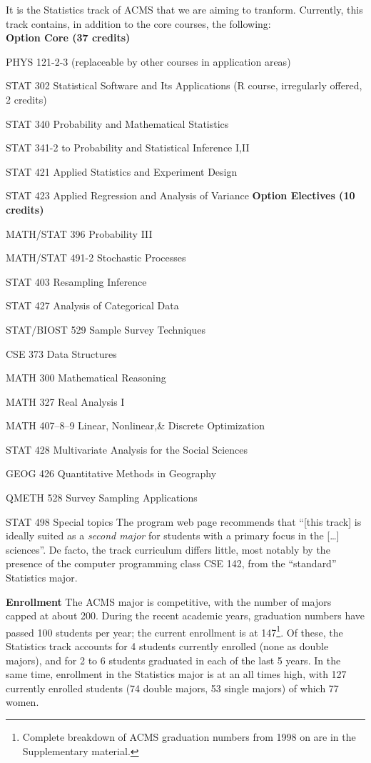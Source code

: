 It is the Statistics track of ACMS that we are aiming to
tranform. Currently, this track contains, in addition to the core
courses, the following:
\\
{\bf Option Core (37 credits)}
\bits
    \item {\sc PHYS 121-2-3} (replaceable by other courses in application areas)
    \item {\sc STAT 302} Statistical Software and Its Applications (R course, irregularly offered, 2 credits)
    \item {\sc STAT 340} Probability and Mathematical Statistics
    \item {\sc STAT 341-2} to Probability and Statistical Inference I,II
    \item {\sc STAT 421} Applied Statistics and Experiment Design
    \item {\sc STAT 423} Applied Regression and Analysis of Variance
\eits
{\bf Option Electives (10 credits)}
\bits
    \item {\sc MATH/STAT 396} Probability III
    \item {\sc MATH/STAT 491-2} Stochastic Processes
    \item {\sc STAT 403}  Resampling Inference
    \item {\sc STAT 427}  Analysis of Categorical Data
    \item {\sc STAT/BIOST 529} Sample Survey Techniques
    \item {\sc CSE 373} Data Structures
    \item {\sc MATH 300} Mathematical Reasoning
    \item {\sc MATH 327}  Real Analysis I
    \item {\sc MATH 407--8--9} Linear, Nonlinear,\& Discrete Optimization
    \item {\sc STAT 428} Multivariate Analysis for the Social Sciences
    \item {\sc GEOG 426} Quantitative Methods in Geography
    \item {\sc QMETH 528} Survey Sampling Applications
    \item {\sc STAT 498} Special topics
\eits
The program web page recommends that ``[this track] is ideally suited as a {\em second major} for students with a primary focus in the [\ldots] sciences''.
De facto, the track curriculum differs little, most notably by the
presence of the computer programming class {\sc CSE 142}, from the
``standard'' Statistics major.

{\bf Enrollment} The ACMS major is competitive, with the number of
majors capped at about 200.  During the recent academic years,
graduation numbers have passed 100 students per year; the current
enrollment is at 147\footnote{Complete breakdown of ACMS graduation
  numbers from 1998 on are in the Supplementary material.}.  Of these,
the Statistics track accounts for 4 students currently enrolled (none
as double majors), and for 2 to 6 students graduated in each of the
last 5 years. In the same time, enrollment in the Statistics major is
at an all times high, with 127 currently enrolled students (74 double
majors, 53 single majors) of which 77 women.


